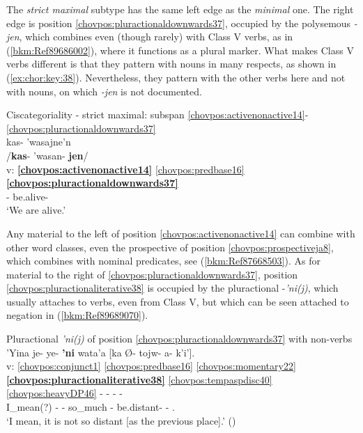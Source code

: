 \documentclass[output=paper]{langscibook}
\begin{document}
The \textit{strict maximal} subtype has the same left edge as the \textit{minimal} one. The right edge is position \ref{chovpos:pluractionaldownwards37}, occupied by the polysemous \textit{-jen}, which combines even (though rarely) with Class V verbs, as in (\ref{bkm:Ref89686002}), where it functions as a plural marker. What makes Class V verbs different is that they pattern with nouns in many respects, as shown in (\ref{ex:chor:key:38}). Nevertheless, they pattern with the other verbs here and not with nouns, on which  \textit{-jen} is not documented.


\ea\label{bkm:Ref89686002} Ciscategoriality - strict maximal: subspan \ref{chovpos:activenonactive14}{}-\ref{chovpos:pluractionaldownwards37}\\
\gllll {} kas- 'wasajne'n\\ 
    {} /\textbf{kas}{}- 'wasan- \textbf{jen}/ \\
    v: \textbf{\ref{chovpos:activenonactive14}} \ref{chovpos:predbase16} \textbf{\ref{chovpos:pluractionaldownwards37}}\\ 
    {} \textbf{\First\Pl{}}- be.alive- \textbf{\Jen{}}\\
\glt `We are alive.'
\z 

Any material to the left of position \ref{chovpos:activenonactive14} can combine with other word classes, even the prospective of position \ref{chovpos:prospectiveja8}, which combines with nominal predicates, see (\ref{bkm:Ref87668503}). As for material to the right of \ref{chovpos:pluractionaldownwards37}, position \ref{chovpos:pluractionaliterative38} is occupied by the pluractional -\textit{'ni(j)}, which usually attaches to verbs, even from Class V, but which can be seen attached to negation in (\ref{bkm:Ref89689070}).

\ea\label{bkm:Ref89689070} Pluractional \textit{'ni(j)} of position \ref{chovpos:pluractionaldownwards37} with non-verbs\\
\glll {} 'Yina je{}- ye{}- \textbf{'ni} wata'a [ka Ø{}- tojw{}- a{}- k'i']. \\
    v: \ref{chovpos:conjunct1} \ref{chovpos:predbase16} \ref{chovpos:momentary22} \textbf{\ref{chovpos:pluractionaliterative38}} \ref{chovpos:tempaspdisc40} \ref{chovpos:heavyDP46} - - - - \\ 
    {} I\_mean(?) \Neg{}- \Mom{}- \textbf{\Plact{}} so\_much \Comp{} \Third{}- be.distant- \Irr{}- \Ap.\Distr{}\\
\glt `I mean, it is not so distant [as the previous place].' (\citealt[94]{DraysonGomez2000})
\z 
\end{document}
